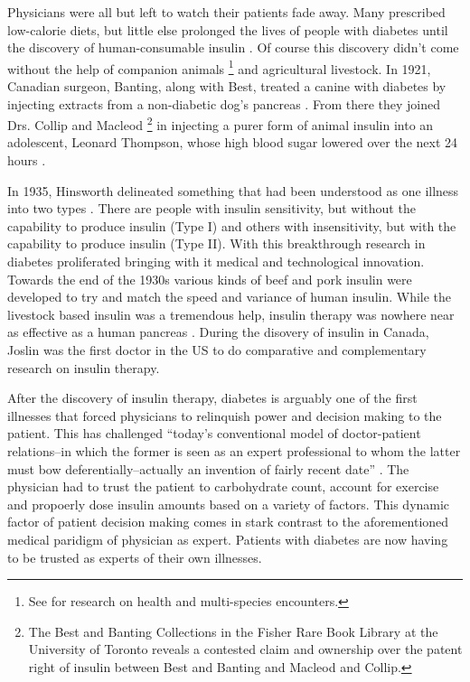 \documentclass[12pt]{article}
\begin{document}
Physicians were all but left to watch their patients fade away. Many prescribed low-calorie diets, but little else prolonged the lives of people with diabetes until the discovery of human-consumable insulin \citep{ebstein_history_1989}. Of course this discovery didn't come without the help of companion animals \citep{balfe_diabetes_2008}\footnote{See \citet{wilkie_multispecies_2013} for research on health and multi-species encounters.} and agricultural livestock. In 1921, Canadian surgeon, Banting, along with Best, treated a canine with diabetes by injecting extracts from a non-diabetic dog's pancreas \citep{zimmermann_first_1989}. From there they joined Drs. Collip and Macleod \footnote{The Best and Banting Collections in the Fisher Rare Book Library at the University of Toronto reveals a contested claim and ownership over the patent right of insulin between Best and Banting and Macleod and Collip.} in injecting a purer form of animal insulin into an adolescent, Leonard Thompson, whose high blood sugar lowered over the next 24 hours \citep{sattley_history_1996}.  

In 1935, Hinsworth delineated something that had been understood as one illness into two types \citep{sattley_history_1996}. There are people with insulin sensitivity, but without the capability to produce insulin (Type I) and others with insensitivity, but with the capability to produce insulin (Type II).  With this breakthrough research in diabetes proliferated bringing with it medical and technological innovation. Towards the end of the 1930s various kinds of beef and pork insulin were developed to try and match the speed and variance of human insulin. While the livestock based insulin was a tremendous help, insulin therapy was nowhere near as effective as a human pancreas \citep{sattley_history_1996}. During the disovery of insulin in Canada, Joslin was the first doctor in the US to do comparative and complementary research on insulin therapy.

After the discovery of insulin therapy, diabetes is arguably one of the first illnesses that forced physicians to relinquish power and decision making to the patient. This has challenged ``today's conventional model of doctor-patient relations--in which the former is seen as an expert professional to whom the latter must bow deferentially--actually an invention of fairly recent date'' \citep[p. 330]{philo_1987_Patients}. The physician had to trust the patient to carbohydrate count, account for exercise and propoerly dose insulin amounts based on a variety of factors. This dynamic factor of patient decision making comes in stark contrast to the aforementioned medical paridigm of physician as expert. Patients with diabetes are now having to be trusted as experts of their own illnesses. 
\end{document}
